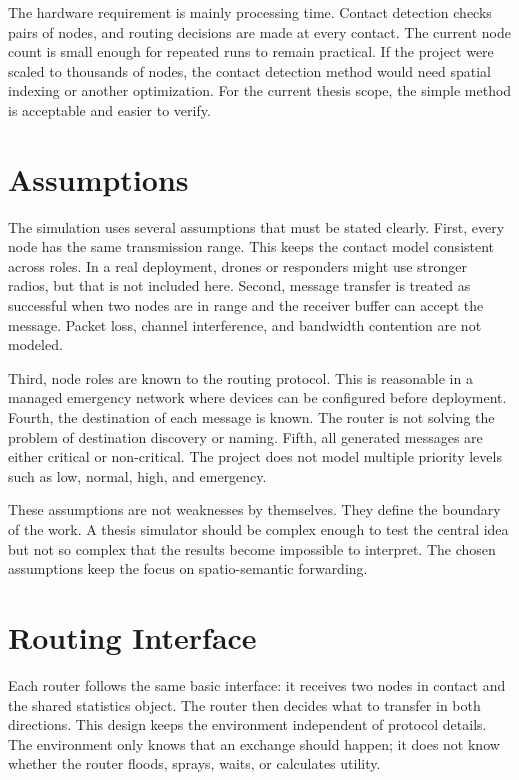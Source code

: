 The hardware requirement is mainly processing time. Contact detection checks pairs of nodes, and routing decisions are made at every contact. The current node count is small enough for repeated runs to remain practical. If the project were scaled to thousands of nodes, the contact detection method would need spatial indexing or another optimization. For the current thesis scope, the simple method is acceptable and easier to verify.

\section{Assumptions}
The simulation uses several assumptions that must be stated clearly. First, every node has the same transmission range. This keeps the contact model consistent across roles. In a real deployment, drones or responders might use stronger radios, but that is not included here. Second, message transfer is treated as successful when two nodes are in range and the receiver buffer can accept the message. Packet loss, channel interference, and bandwidth contention are not modeled.

Third, node roles are known to the routing protocol. This is reasonable in a managed emergency network where devices can be configured before deployment. Fourth, the destination of each message is known. The router is not solving the problem of destination discovery or naming. Fifth, all generated messages are either critical or non-critical. The project does not model multiple priority levels such as low, normal, high, and emergency.

These assumptions are not weaknesses by themselves. They define the boundary of the work. A thesis simulator should be complex enough to test the central idea but not so complex that the results become impossible to interpret. The chosen assumptions keep the focus on spatio-semantic forwarding.

\section{Routing Interface}
Each router follows the same basic interface: it receives two nodes in contact and the shared statistics object. The router then decides what to transfer in both directions. This design keeps the environment independent of protocol details. The environment only knows that an exchange should happen; it does not know whether the router floods, sprays, waits, or calculates utility.

